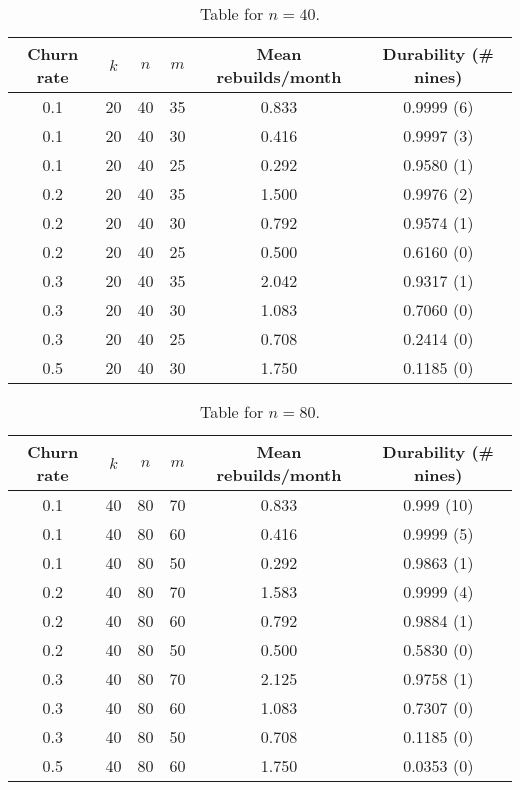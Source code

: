\begin{table}[H]\centering


\begin{tabular}{| c | c c c | c | c|}\hline
Churn rate &$k$& $n$ & $m$ &Mean rebuilds/month&Durability (\# nines) \\\hline 
0.1 &20& 40 & 35 & 0.833 & 0.9999 (6) \\ 
0.1 &20& 40 & 30 & 0.416 & 0.9997 (3)\\  
0.1 &20& 40 & 25 & 0.292 & 0.9580 (1)\\\hline
 
0.2 &20& 40 & 35 & 1.500 &0.9976 (2)\\  
0.2 &20& 40 & 30 & 0.792 &0.9574 (1)\\  
0.2 &20& 40 & 25 & 0.500 &0.6160 (0)\\\hline
 
0.3 &20& 40 & 35 & 2.042 &0.9317 (1)\\  
0.3 &20& 40 & 30 & 1.083 &0.7060 (0)\\  
0.3 &20& 40 & 25 & 0.708 &0.2414 (0)\\\hline

0.5 &20& 40 & 30 & 1.750 &0.1185 (0)\\ \hline
\end{tabular}
\caption{Table for $n=40$.}\label{table:n=40}
\end{table}








\begin{table}[H]\centering
\begin{tabular}{| c | c c c | c | c |}\hline
Churn rate&$k$&$n$&$m$&Mean rebuilds/month&Durability (\# nines) \\\hline 
0.1 &40& 80 & 70 & 0.833 & 0.999 (10)\\  
0.1 &40& 80 & 60 & 0.416 & 0.9999 (5)\\  
0.1 &40& 80 & 50 & 0.292 & 0.9863 (1)\\\hline 

0.2 &40& 80 & 70 & 1.583 & 0.9999 (4)\\  
0.2 &40& 80 & 60 & 0.792 & 0.9884 (1)\\  
0.2 &40& 80 & 50 & 0.500 & 0.5830 (0)\\\hline

0.3 &40& 80 & 70 & 2.125 & 0.9758 (1)\\  
0.3 &40& 80 & 60 & 1.083 & 0.7307 (0)\\  
0.3 &40& 80 & 50 & 0.708 & 0.1185 (0)\\\hline

0.5 &40& 80 & 60 & 1.750 &0.0353 (0)\\ \hline
\end{tabular}
\caption{Table for $n=80$.}\label{table:n=80}
\end{table}











